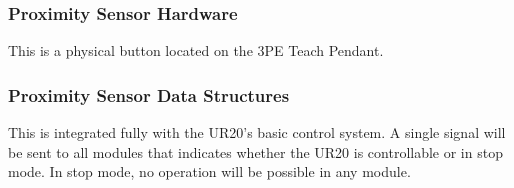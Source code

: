 \subsubsection{Proximity Sensor Hardware}
This is a physical button located on the 3PE Teach Pendant. 

\subsubsection{Proximity Sensor Data Structures}
This is integrated fully with the UR20's basic control system. A single signal will be sent to all modules that indicates whether the UR20 is controllable or in stop mode. In stop mode, no operation will be possible in any module.
